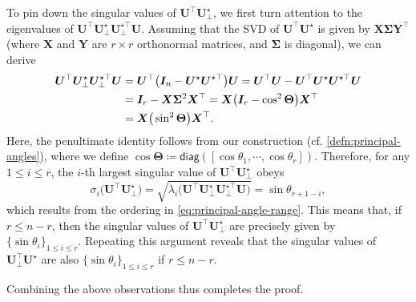 To pin down the singular values of $\bm{U}^{\top}{\bm{U}}_{\perp}^{\star}$, we first turn attention to the eigenvalues of $\bm{U}^{\top}\bm{U}_{\perp}^{\star}\bm{U}_{\perp}^{\star\top}\bm{U}$. Assuming that the SVD of $\bm{U}^{\top}\bm{U}^{\star}$ is
given by $\bm{X}\bm{\Sigma}\bm{Y}^{\top}$ (where $\bm{X}$ and $\bm{Y}$
are $r\times r$ orthonormal matrices, and $\bm{\Sigma}$ is diagonal), we can derive
%
\begin{align}
\bm{U}^{\top}\bm{U}_{\perp}^{\star}\bm{U}_{\perp}^{\star\top}\bm{U} & =\bm{U}^{\top}\big(\bm{I}_{n}-\bm{U}^{\star}\bm{U}^{\star\top}\big)\bm{U}=\bm{U}^{\top}\bm{U}-\bm{U}^{\top}\bm{U}^{\star}\bm{U}^{\star\top}\bm{U} \notag\\
	& =\bm{I}_{r}-\bm{X}\bm{\Sigma}^{2}\bm{X}^{\top}=\bm{X}\big(\bm{I}_{r}-\cos^{2}\bm{\Theta}\big)\bm{X}^{\top} \notag\\
	& = \bm{X} \big( \sin^{2}\bm{\Theta} \big) \bm{X}^{\top} .
	\label{eq:U-Uperp-equiv}
\end{align}
%
Here, the penultimate identity follows from our construction (cf. \eqref{defn:principal-angles}), where
	we define $\cos\bm{\Theta} \coloneqq \mathsf{diag}([\cos\theta_1,\cdots,\cos\theta_r])$.
%
Therefore, for any $1\le i \le r$, the $i$-th largest singular value of $\bm{U}^{\top}\bm{U}_{\perp}^{\star}$ obeys
%
\[
\sigma_{i}\big(\bm{U}^{\top}\bm{U}_{\perp}^{\star}\big)=\sqrt{\lambda_{i}\big(\bm{U}^{\top}\bm{U}_{\perp}^{\star}\bm{U}_{\perp}^{\star\top}\bm{U} \big)}
	=\sin\theta_{r+1-i},
\]
%
which results from the ordering in \eqref{eq:principal-angle-range}.  This means that, if $r\leq n-r$, then the singular values of $\bm{U}^{\top}{\bm{U}}_{\perp}^{\star}$ are precisely given by $\{\sin\theta_{i}\}_{1\leq i\leq r}$.
Repeating this argument reveals that the singular values of $\bm{U}_{\perp}^{\top} {\bm{U}}^{\star}$
are also $\{\sin\theta_{i}\}_{1\leq i\leq r}$ if $r\leq n-r$.

Combining the above observations thus completes the proof.


